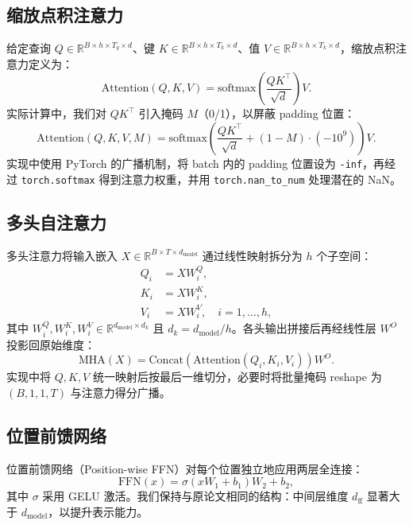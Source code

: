\documentclass[12pt,a4paper]{article}
\begin{document}
\subsection{缩放点积注意力}
给定查询 $Q \in \mathbb{R}^{B \times h \times T_q \times d}$、键 $K \in \mathbb{R}^{B \times h \times T_k \times d}$、值 $V \in \mathbb{R}^{B \times h \times T_k \times d}$，缩放点积注意力定义为：
\begin{equation}
    \mathrm{Attention}(Q, K, V) = \mathrm{softmax}\left(\frac{QK^\top}{\sqrt{d}}\right)V.
\end{equation}
实际计算中，我们对 $QK^\top$ 引入掩码 $M$（0/1），以屏蔽 padding 位置：
\begin{equation}
    \mathrm{Attention}(Q, K, V, M) = \mathrm{softmax}\left(\frac{QK^\top}{\sqrt{d}} + (1-M)\cdot (-10^{9})\right)V.
\end{equation}
实现中使用 PyTorch 的广播机制，将 batch 内的 padding 位置设为 \texttt{-inf}，再经过 \texttt{torch.softmax} 得到注意力权重，并用 \texttt{torch.nan\_to\_num} 处理潜在的 NaN。

\subsection{多头自注意力}
多头注意力将输入嵌入 $X \in \mathbb{R}^{B \times T \times d_{\text{model}}}$ 通过线性映射拆分为 $h$ 个子空间：
\begin{equation}
\begin{aligned}
    Q_i &= X W_i^Q,\\
    K_i &= X W_i^K,\\
    V_i &= X W_i^V, \quad i=1,\dots,h,
\end{aligned}
\end{equation}
其中 $W_i^Q,W_i^K,W_i^V \in \mathbb{R}^{d_{\text{model}} \times d_k}$ 且 $d_k = d_{\text{model}} / h$。各头输出拼接后再经线性层 $W^O$ 投影回原始维度：
\begin{equation}
    \mathrm{MHA}(X) = \mathrm{Concat}\left(\mathrm{Attention}(Q_i,K_i,V_i)\right) W^O.
\end{equation}
实现中将 $Q,K,V$ 统一映射后按最后一维切分，必要时将批量掩码 reshape 为 $(B,1,1,T)$ 与注意力得分广播。

\subsection{位置前馈网络}
位置前馈网络（Position-wise FFN）对每个位置独立地应用两层全连接：
\begin{equation}
    \mathrm{FFN}(x) = \sigma(xW_1 + b_1)W_2 + b_2,
\end{equation}
其中 $\sigma$ 采用 GELU 激活。我们保持与原论文相同的结构：中间层维度 $d_{\text{ff}}$ 显著大于 $d_{\text{model}}$，以提升表示能力。
\end{document}
